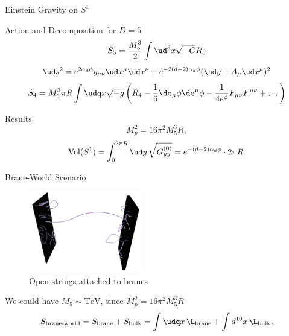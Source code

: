 \begin{frame}{Einstein Gravity on \texorpdfstring{$S^1$}{S1}}
	\begin{block}{Action and Decomposition for $D=5$}
		\begin{equation*}
			S_5 = \frac{M^3_5}{2} \int \ud^5 x \sqrt{-G} R_5
		\end{equation*}
		\begin{equation*}
			\ud s^2 =  e^{2\alpha_d \phi} g_{\mu\nu} \ud x^\mu \ud x^\nu + e^{-2(d-2)\alpha_d \phi} (\ud y + A_\mu \ud x^\mu)^2
		\end{equation*}
		\begin{equation*}
			S_4 = M^3_5 \pi R \int \udq x \sqrt{-g} \left( R_4 -\frac{1}{6} \de_\mu \phi \de^\mu \phi - \frac{1}{4 e^\phi} F_{\mu\nu} F^{\mu\nu} + \dots \right)
		\end{equation*}
	\end{block}

	\begin{block}{Results}
		\begin{equation*}
			M^2_p = 16 \pi^2 M^3_5 R,
		\end{equation*}
		\begin{equation*}
			\textup{Vol} (S^1)  = \int_{0}^{2\pi R} \ud y \, \sqrt{G^{(0)}_{yy}} = e^{-(d-2)\alpha_d \phi} \cdot 2\pi R .
		\end{equation*}
	\end{block}
\end{frame}

\begin{frame}{Brane-World Scenario}
	\begin{figure}[!h]
		\centering
		\includegraphics[width=50mm]{graphics/brane-world.PNG}
		\caption{Open strings attached to branes}
	\end{figure}
	\begin{block}{\texorpdfstring{We could have \texorpdfstring{$M_5\sim \text{TeV}$}{energy}, since $M^2_p = 16 \pi^2 M^3_5 R$}{Previous Relation}}
		\begin{equation*}
			S_\text{brane-world} = S_\text{brane} + S_\text{bulk} = \int \udq x \, \L_\text{brane} + \int d^{10} x \, \L_\text{bulk} .
		\end{equation*}
	\end{block}
\end{frame}

